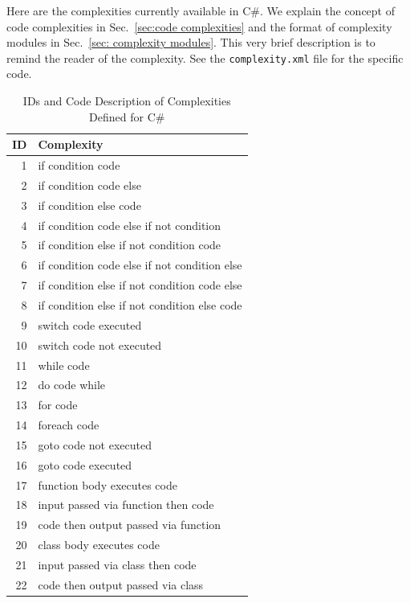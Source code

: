 \documentclass[12pt]{article}
\newcommand{\CSharp}{C{\fontseries{b}\selectfont\#}}
\begin{document}
Here are the complexities currently available in \CSharp.
We explain the concept of code complexities in Sec.~\ref{sec:code complexities} and
the format of complexity modules in Sec.~\ref{sec: complexity modules}.
This very brief description is to remind the reader of the complexity.
See the \verb|complexity.xml| file for the specific code.

\begin{table}[H]
\centering
\begin{tabular}{|r|l|}
\hline
\textbf{ID} & \textbf{Complexity} \\
\hline
 1 & if condition code \\
\hline
 2 & if condition code else \\
\hline
 3 & if condition else code \\
\hline
 4 & if condition code else if not condition \\
\hline
 5 & if condition else if not condition code \\
\hline
 6 & if condition code else if not condition else \\
\hline
 7 & if condition else if not condition code else \\
 \hline
 8 & if condition else if not condition else code \\
\hline
 9 & switch code executed \\
\hline
10 & switch code not executed \\
\hline
11 & while code \\
\hline

12 & do code while \\
\hline
13 & for code \\
\hline
14 & foreach code \\
\hline
15 & goto code not executed \\
\hline
16 & goto code executed \\
\hline
17 & function body executes code \\
\hline
18 & input passed via function then code \\
\hline
19 & code then output passed via function \\
\hline
20 & class body executes code \\
\hline
21 & input passed via class then code \\
\hline
22 & code then output passed via class \\
\hline
\end{tabular}
\caption{IDs and Code Description of Complexities Defined for \CSharp}
\label{tab:complexity IDs for CSharp}
\end{table}
\end{document}
